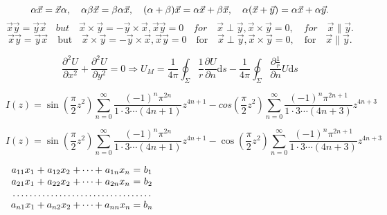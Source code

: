 \documentclass{article}
\begin{document}
    \begin{displaymath}
        \alpha\vec{x} = \vec{x}\alpha,\quad \alpha\beta\vec{x} = \beta\alpha\vec{x},\quad (\alpha + \beta)\vec{x} = \alpha\vec{x} + \beta\vec{x}, \quad \alpha(\vec{x} + \vec{y})=\alpha\vec{x} + \alpha\vec{y}.\\
    \end{displaymath}
    \begin{displaymath}
        \vec{x}\vec{y}=\vec{y}\vec{x}\quad but \quad \vec{x} \times \vec{y} = -\vec{y} \times \vec{x}, \vec{x}\vec{y}=0\quad for \quad\vec{x}\perp\vec{y}, \vec{x} \times \vec{y} = 0,\quad for\quad \vec{x} \parallel \vec{y}.
    \end{displaymath}
    \begin{displaymath}
        \vec{x}\vec{y}=\vec{y}\vec{x}\quad \mbox{but} \quad \vec{x} \times \vec{y} = -\vec{y} \times \vec{x}, \vec{x}\vec{y}=0\quad \mbox{for}\quad\vec{x}\perp\vec{y}, \vec{x} \times \vec{y} = 0,\quad \mbox{for}\quad \vec{x} \parallel \vec{y}.
    \end{displaymath}

    \begin{equation}
        \frac{\partial^2U}{\partial x^2} + \frac{\partial^2U}{\partial y^2}=0 \Longrightarrow U_M = \frac{1}{4\pi} \oint_\Sigma \frac{1}{r} \frac{\partial U}{\partial n}\mathrm{d}s - \frac{1}{4\pi}\oint_\Sigma \frac{\partial \frac{1}{r}}{\partial n}U\mathrm{d}s
    \end{equation}

    \begin{equation}
        I(z)=\sin(\frac{\pi}{2} z^2)\sum_{n=0}^\infty \frac{(-1)^n \pi^{2n}}{1 \cdot 3 \cdots(4n +1)} z^{4n+1} - cos(\frac{\pi}{2} z^2) \sum_{n=0}^\infty \frac{(-1)^n \pi^{2n+1}}{1\cdot3\cdots(4n+3)} z^{4n+3}
    \end{equation}


    \begin{equation}
        I(z)=\sin\left(\frac{\pi}{2} z^2\right)\sum_{n=0}^\infty \frac{(-1)^n \pi^{2n}}{1 \cdot 3 \cdots(4n +1)} z^{4n+1} - \cos\left(\frac{\pi}{2} z^2\right) \sum_{n=0}^\infty \frac{(-1)^n \pi^{2n+1}}{1\cdot3\cdots(4n+3)} z^{4n+3}
    \end{equation}

    \begin{math}
        \begin{array}{c@{\:+\:}c@{\:+\cdots+\:}c@{\;=\;}c}
            a_{11}x_1 & a_{12}x_2 & a_{1n}x_n & b_1 \\
            a_{21}x_1 & a_{22}x_2 & a_{2n}x_n & b_2 \\
            \multicolumn{4}{c}{\dotfill} \\
            a_{n1}x_1 & a_{n2}x_2 & a_{nn}x_n & b_n \\
        \end{array}
    \end{math}
\end{document}
